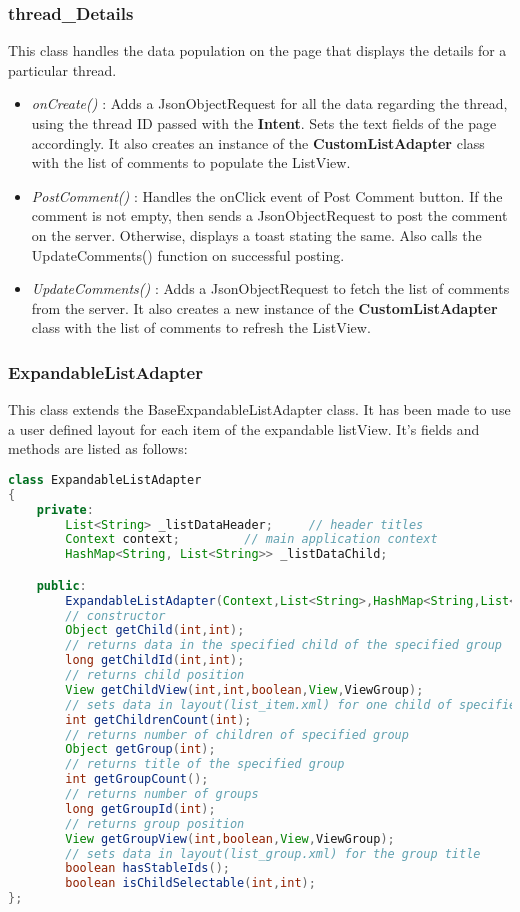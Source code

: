 \documentclass{article}
\begin{document}
\subsubsection{thread\_Details}
\par\noindent This class handles the data population on the page that displays the details for a particular thread.
\begin{itemize}
\item \textit{onCreate()} : Adds a JsonObjectRequest for all the data regarding the thread, using the thread ID passed with the \textbf{Intent}. Sets the text fields of the page accordingly. It also creates an instance of the \textbf{CustomListAdapter} class with the list of comments to populate the ListView.
\item \textit{PostComment()} : Handles the onClick event of Post Comment button. If the comment is not empty, then sends a JsonObjectRequest to post the comment on the server. Otherwise, displays a toast stating the same. Also calls the UpdateComments() function on successful posting.
\item \textit{UpdateComments()} : Adds a JsonObjectRequest to fetch the list of comments from the server. It also creates a new instance of the \textbf{CustomListAdapter} class with the list of comments to refresh the ListView.
\end{itemize}

\subsubsection{ExpandableListAdapter}
\par\noindent This class extends the BaseExpandableListAdapter class. It has been made to use a user defined layout for each item of the expandable listView. It's fields and methods are listed as follows:

\begin{lstlisting}[language=Java, caption={Fields \& Methods of CustomListAdapter}]
class ExpandableListAdapter
{
	private:
		List<String> _listDataHeader;     // header titles
		Context context;	     // main application context
		HashMap<String, List<String>> _listDataChild;

	public:
		ExpandableListAdapter(Context,List<String>,HashMap<String,List<String>>)
		// constructor
		Object getChild(int,int);
		// returns data in the specified child of the specified group
		long getChildId(int,int);
		// returns child position
		View getChildView(int,int,boolean,View,ViewGroup);
		// sets data in layout(list_item.xml) for one child of specified group
		int getChildrenCount(int);
		// returns number of children of specified group
		Object getGroup(int);
		// returns title of the specified group
		int getGroupCount();
		// returns number of groups
		long getGroupId(int);
		// returns group position
		View getGroupView(int,boolean,View,ViewGroup);
		// sets data in layout(list_group.xml) for the group title
		boolean hasStableIds();
		boolean isChildSelectable(int,int);
};
\end{lstlisting}
\end{document}
